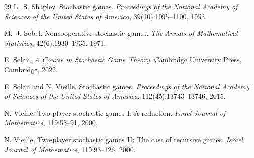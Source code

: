 \documentclass[11pt]{article}
\theoremstyle{definition}
\newcommand{\1}{\mathbf{1}}
\begin{document}
\begin{thebibliography}{99}
L.~S. Shapley.
\newblock Stochastic games.
\newblock \emph{Proceedings of the National Academy of Sciences of the United States of America}, 39(10):1095--1100, 1953.

M.~J. Sobel.
\newblock Noncooperative stochastic games.
\newblock \emph{The Annals of Mathematical Statistics}, 42(6):1930--1935, 1971.

E. Solan.
\newblock \emph{A Course in Stochastic Game Theory}.
\newblock Cambridge University Press, Cambridge, 2022.

E. Solan and N. Vieille.
\newblock Stochastic games.
\newblock \emph{Proceedings of the National Academy of Sciences of the United States of America}, 112(45):13743--13746, 2015.

N. Vieille.
\newblock Two-player stochastic games {I}: A reduction.
\newblock \emph{Israel Journal of Mathematics}, 119:55--91, 2000.

N. Vieille.
\newblock Two-player stochastic games {II}: The case of recursive games.
\newblock \emph{Israel Journal of Mathematics}, 119:93--126, 2000.

\end{thebibliography}
\end{document}
